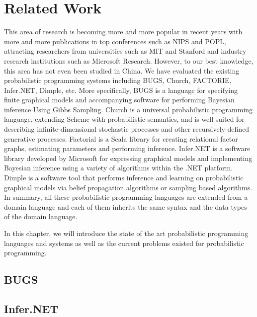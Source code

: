 \chapter{Related Work}
\label{chap:related}
This area of research is becoming more and more popular in recent years with more and more publications in top conferences such as NIPS and POPL, attracting researchers from universities such as MIT and Stanford and industry research institutions such as Microsoft Research. However, to our best knowledge, this area has not even been studied in China. We have evaluated the existing probabilistic programming systems including BUGS, Church, FACTORIE, Infer.NET, Dimple, etc. More specifically, BUGS is a language for specifying finite graphical models and accompanying software for performing Bayesian inference Using Gibbs Sampling. Church is a universal probabilistic programming language, extending Scheme with probabilistic semantics, and is well suited for describing infinite-dimensional stochastic processes and other recursively-defined generative processes. Factorial is a Scala library for creating relational factor graphs, estimating parameters and performing inference. Infer.NET is a software library developed by Microsoft for expressing graphical models and implementing Bayesian inference using a variety of algorithms within the .NET platform. Dimple is a software tool that performs inference and learning on probabilistic graphical models via belief propagation algorithms or sampling based algorithms. In summary, all these probabilistic programming languages are extended from a domain language and each of them inherits the same syntax and the data types of the domain language.

In this chapter, we will introduce the state of the art probabilistic programming languages and systems as well as the current problems existed for probabilistic programming.

\section{BUGS}

\section{Infer.NET}

